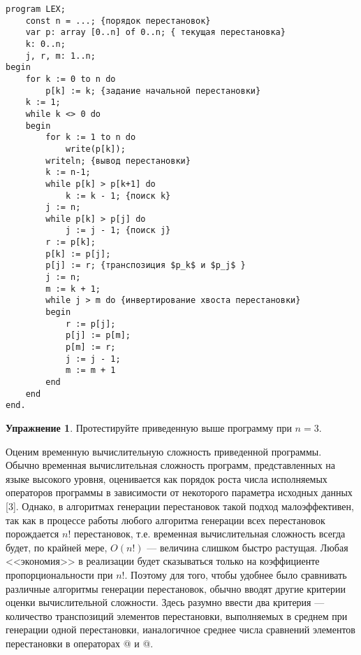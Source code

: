 \documentclass[12pt,a4paper]{article}
\theoremstyle{plain}
\theoremstyle{definition}
\newtheorem*{task}{Упражнение}
\theoremstyle{remark}
\newtheorem*{comment}{Комментарий}
\begin{document}
\begin{verbatim}
program LEX;
    const n = ...; {порядок перестановок}
    var p: array [0..n] of 0..n; { текущая перестановка}
    k: 0..n;
    j, r, m: 1..n;
begin
    for k := 0 to n do
        p[k] := k; {задание начальной перестановки}
    k := 1;
    while k <> 0 do
    begin
        for k := 1 to n do
            write(p[k]);
        writeln; {вывод перестановки}
        k := n-1;
        while p[k] > p[k+1] do
            k := k - 1; {поиcк k}
        j := n;
        while p[k] > p[j] do
            j := j - 1; {поиск j}
        r := p[k];
        p[k] := p[j];
        p[j] := r; {транспозиция $p_k$ и $p_j$ }
        j := n;
        m := k + 1;
        while j > m do {инвертирование хвоста перестановки}
        begin
            r := p[j];
            p[j] := p[m];
            p[m] := r;
            j := j - 1;
            m := m + 1
        end
    end
end.
\end{verbatim}

\begin{comment}
Нулевой элемент включен в массив $p$ для того, чтобы обеспечить конец цикла \verb@{поиск k}@ после генерации последней перестановки.
\end{comment}

\begin{task}
Протестируйте приведенную выше программу при $n=3$.
\end{task}

Оценим временную вычислительную сложность приведенной программы. Обычно временная вычислительная сложность программ, представленных на языке высокого уровня, оценивается как порядок роста числа исполняемых операторов программы в зависимости от некоторого параметра исходных данных [3]. Однако, в алгоритмах генерации перестановок такой подход малоэффективен, так как в процессе работы любого алгоритма генерации всех перестановок порождается $n!$ перестановок, т.е. временная вычислительная сложность всегда будет, по крайней мере, $O(n!)$ --- величина слишком быстро растущая. Любая <<экономия>> в реализации будет сказываться только на коэффициенте пропорциональности при $n!$. Поэтому для того, чтобы удобнее было сравнивать различные алгоритмы генерации перестановок, обычно вводят другие критерии оценки вычислительной сложности. Здесь разумно ввести два критерия --- количество транспозиций элементов перестановки, выполняемых в среднем при генерации одной перестановки, ианалогичное среднее числа сравнений элементов перестановки в операторах @ и @.
\end{document}

